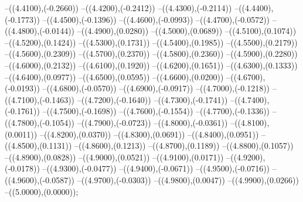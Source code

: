 {	--({\sx*(4.4100)},{\sy*(-0.2660)})
	--({\sx*(4.4200)},{\sy*(-0.2412)})
	--({\sx*(4.4300)},{\sy*(-0.2114)})
	--({\sx*(4.4400)},{\sy*(-0.1773)})
	--({\sx*(4.4500)},{\sy*(-0.1396)})
	--({\sx*(4.4600)},{\sy*(-0.0993)})
	--({\sx*(4.4700)},{\sy*(-0.0572)})
	--({\sx*(4.4800)},{\sy*(-0.0144)})
	--({\sx*(4.4900)},{\sy*(0.0280)})
	--({\sx*(4.5000)},{\sy*(0.0689)})
	--({\sx*(4.5100)},{\sy*(0.1074)})
	--({\sx*(4.5200)},{\sy*(0.1424)})
	--({\sx*(4.5300)},{\sy*(0.1731)})
	--({\sx*(4.5400)},{\sy*(0.1985)})
	--({\sx*(4.5500)},{\sy*(0.2179)})
	--({\sx*(4.5600)},{\sy*(0.2309)})
	--({\sx*(4.5700)},{\sy*(0.2370)})
	--({\sx*(4.5800)},{\sy*(0.2360)})
	--({\sx*(4.5900)},{\sy*(0.2280)})
	--({\sx*(4.6000)},{\sy*(0.2132)})
	--({\sx*(4.6100)},{\sy*(0.1920)})
	--({\sx*(4.6200)},{\sy*(0.1651)})
	--({\sx*(4.6300)},{\sy*(0.1333)})
	--({\sx*(4.6400)},{\sy*(0.0977)})
	--({\sx*(4.6500)},{\sy*(0.0595)})
	--({\sx*(4.6600)},{\sy*(0.0200)})
	--({\sx*(4.6700)},{\sy*(-0.0193)})
	--({\sx*(4.6800)},{\sy*(-0.0570)})
	--({\sx*(4.6900)},{\sy*(-0.0917)})
	--({\sx*(4.7000)},{\sy*(-0.1218)})
	--({\sx*(4.7100)},{\sy*(-0.1463)})
	--({\sx*(4.7200)},{\sy*(-0.1640)})
	--({\sx*(4.7300)},{\sy*(-0.1741)})
	--({\sx*(4.7400)},{\sy*(-0.1761)})
	--({\sx*(4.7500)},{\sy*(-0.1698)})
	--({\sx*(4.7600)},{\sy*(-0.1554)})
	--({\sx*(4.7700)},{\sy*(-0.1336)})
	--({\sx*(4.7800)},{\sy*(-0.1054)})
	--({\sx*(4.7900)},{\sy*(-0.0723)})
	--({\sx*(4.8000)},{\sy*(-0.0361)})
	--({\sx*(4.8100)},{\sy*(0.0011)})
	--({\sx*(4.8200)},{\sy*(0.0370)})
	--({\sx*(4.8300)},{\sy*(0.0691)})
	--({\sx*(4.8400)},{\sy*(0.0951)})
	--({\sx*(4.8500)},{\sy*(0.1131)})
	--({\sx*(4.8600)},{\sy*(0.1213)})
	--({\sx*(4.8700)},{\sy*(0.1189)})
	--({\sx*(4.8800)},{\sy*(0.1057)})
	--({\sx*(4.8900)},{\sy*(0.0828)})
	--({\sx*(4.9000)},{\sy*(0.0521)})
	--({\sx*(4.9100)},{\sy*(0.0171)})
	--({\sx*(4.9200)},{\sy*(-0.0178)})
	--({\sx*(4.9300)},{\sy*(-0.0477)})
	--({\sx*(4.9400)},{\sy*(-0.0671)})
	--({\sx*(4.9500)},{\sy*(-0.0716)})
	--({\sx*(4.9600)},{\sy*(-0.0587)})
	--({\sx*(4.9700)},{\sy*(-0.0303)})
	--({\sx*(4.9800)},{\sy*(0.0047)})
	--({\sx*(4.9900)},{\sy*(0.0266)})
	--({\sx*(5.0000)},{\sy*(0.0000)});
}
